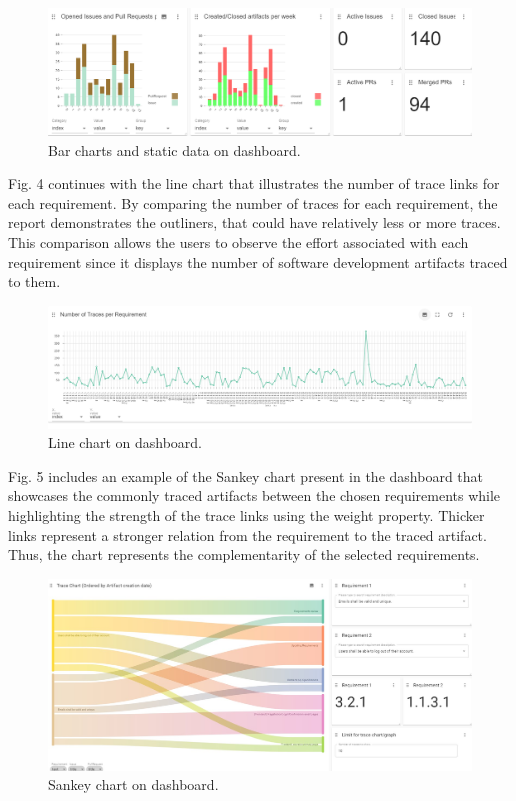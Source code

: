 \documentclass[conference]{IEEEtran}
\begin{document}
\begin{figure}[htb]
    \centering
    \includegraphics[width=0.9\linewidth]{figs/dashboard-barcharts.png}
    \caption{Bar charts and static data on dashboard.}
    \label{fig:dashboard}
\end{figure}

Fig. 4 continues with the line chart that illustrates the number of trace links for each requirement. By comparing the number of traces for each requirement, the report demonstrates the outliners, that could have relatively less or more traces. This comparison allows the users to observe the effort associated with each requirement since it displays the number of software development artifacts traced to them.

\begin{figure}[htb]
    \centering
    \includegraphics[width=0.9\linewidth]{figs/linechart.png}
    \caption{Line chart on dashboard.}
    \label{fig:enter-label}
\end{figure}

Fig. 5 includes an example of the Sankey chart present in the dashboard that showcases the commonly traced artifacts between the chosen requirements while highlighting the strength of the trace links using the weight property. Thicker links represent a stronger relation from the requirement to the traced artifact. Thus, the chart represents the complementarity of the selected requirements.

\begin{figure}[htb]
    \centering
    \includegraphics[width=0.9\linewidth]{figs/sankey.jpg}
    \caption{Sankey chart on dashboard.}
    \label{fig:enter-label}
\end{figure}
\end{document}
